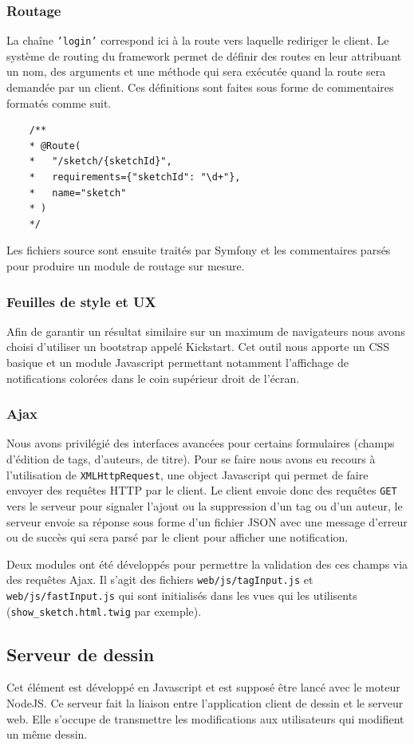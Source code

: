 \documentclass[a4paper]{article}
\begin{document}
\subsubsection{Routage}
La chaîne \texttt{'login'} correspond ici à la route vers laquelle rediriger le client. Le système de routing du framework permet de définir des routes en leur attribuant un nom, des arguments et une méthode qui sera exécutée quand la route sera demandée par un client. Ces définitions sont faites sous forme de commentaires formatés comme suit.
\begin{lstlisting}
	/**
	* @Route(
	*   "/sketch/{sketchId}",
	*   requirements={"sketchId": "\d+"},
	*   name="sketch"
	* )
	*/
\end{lstlisting}
Les fichiers source sont ensuite traités par Symfony et les commentaires parsés pour produire un module de routage sur mesure.

\subsubsection{Feuilles de style et UX}
Afin de garantir un résultat similaire sur un maximum de navigateurs nous avons choisi d'utiliser un bootstrap appelé Kickstart. Cet outil nous apporte un CSS basique et un module Javascript permettant notamment l'affichage de notifications colorées dans le coin supérieur droit de l'écran.

\subsubsection{Ajax}
Nous avons privilégié des interfaces avancées pour certains formulaires (champs d'édition de tags, d'auteurs, de titre). Pour se faire nous avons eu recours à l'utilisation de \texttt{XMLHttpRequest}, une object Javascript qui permet de faire envoyer des requêtes HTTP par le client. Le client envoie donc des requêtes \texttt{GET} vers le serveur pour signaler l'ajout ou la suppression d'un tag ou d'un auteur, le serveur envoie sa réponse sous forme d'un fichier JSON avec une message d'erreur ou de succès qui sera parsé par le client pour afficher une notification.

Deux modules ont été développés pour permettre la validation des ces champs via des requêtes Ajax. Il s'agit des fichiers \texttt{web/js/tagInput.js} et \texttt{web/js/fastInput.js} qui sont initialisés dans les vues qui les utilisents (\texttt{show\_sketch.html.twig} par exemple).

\subsection{Serveur de dessin}
Cet élément est développé en Javascript et est supposé être lancé avec le moteur \cite{NodeJS}NodeJS. Ce serveur fait la liaison entre l'application client de dessin et le serveur web. Elle s'occupe de transmettre les modifications aux utilisateurs qui modifient un même dessin.
\end{document}
